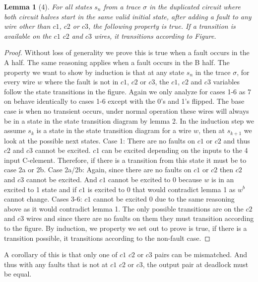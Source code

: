 \documentclass{article}
\newtheorem*{lemma}{Lemma}
\begin{document}
\begin{lemma}[4]
For all states $s_n$ from a trace $\sigma$ in the duplicated circuit where both circuit halves start in the same valid initial state, after adding a fault to any wire other than $c1$, $c2$ or $c3$, the following property is true.  If a transition is available on the $c1$ $c2$ and $c3$ wires, it transitions according to Figure.
\end{lemma}
\begin{proof}
Without loss of generality we prove this is true when a fault occurs in the A half.  The same reasoning applies when a fault occurs in the B half.  The property we want to show by induction is that at any state $s_n$ in the trace $\sigma$, for every wire $w$ where the fault is not in $c1$, $c2$ or $c3$, the $c1$, $c2$ and $c3$ variables follow the state transitions in the figure.  Again we only analyze for cases 1-6 as 7 on behave identically to cases 1-6 except with the 0's and 1's flipped.\newline
The base case is when no transient occurs, under normal operation these wires will always be in a state in the state transition diagram by lemma 2. \newline
In the induction step we assume $s_k$ is a state in the state transition diagram for a wire $w$, then at $s_{k+1}$ we look at the possible next states.  \newline
Case 1:  There are no faults on $c1$ or $c2$ and thus $c2$ and $c3$ cannot be excited.  $c1$ can be excited depending on the inputs to the 4 input C-element.  Therefore, if there is a transition from this state it must be to case 2a or 2b.\newline
Case 2a/2b:  Again, since there are no faults on $c1$ or $c2$ then $c2$ and $c3$ cannot be excited.  And $c1$ cannot be excited to 0 because $w$ is in an excited to 1 state and if $c1$ is excited to 0 that would contradict lemma 1 as $w^b$ cannot change.\newline
Cases 3-6:  $c1$ cannot be excited 0 due to the same reasoning above as it would contradict lemma 1.  The only possible transitions are on the $c2$ and $c3$ wires and since there are no faults on them they must transition according to the figure.
\newline
By induction, we property we set out to prove is true, if there is a transition possible, it transitions according to the non-fault case.
\end{proof}
A corollary of this is that only one of $c1$ $c2$ or $c3$ pairs can be mismatched.  And thus with any faults that is not at $c1$ $c2$ or $c3$, the output pair at deadlock must be equal.
\end{document}
